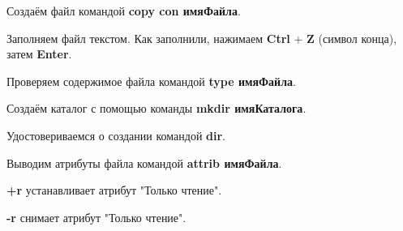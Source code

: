 

Создаём файл командой \textbf{copy con имяФайла}.

Заполняем файл текстом. Как заполнили, нажимаем \textbf{Ctrl} + \textbf{Z} (символ конца), затем \textbf{Enter}.

Проверяем содержимое файла командой \textbf{type имяФайла}.



Создаём каталог с помощью команды \textbf{mkdir имяКаталога}.

Удостовериваемся о создании командой \textbf{dir}.





Выводим атрибуты файла командой \textbf{attrib имяФайла}.



\textbf{+r} устанавливает атрибут "Только чтение".



\textbf{-r} снимает атрибут "Только чтение".






